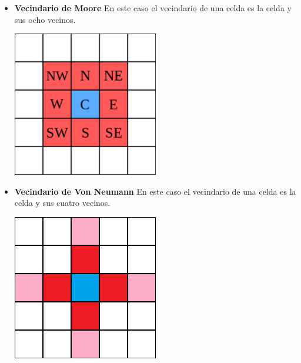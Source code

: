     \begin{itemize}
        \item 
            \begin{minipage}
                {0.5\textwidth}
                \textbf{Vecindario de Moore} En este caso el vecindario de una celda es la celda y sus ocho vecinos.
            \end{minipage}
            \begin{minipage}
                {0.5\textwidth}
                \centering
                \includegraphics[width=0.5\textwidth]{./images/marco_teorico/automatas_celulares/mooreN.png}
                \label{fig:vecindario}
            \end{minipage}
        \item
            \begin{minipage}
                {0.5\textwidth}
                \textbf{Vecindario de Von Neumann} En este caso el vecindario de una celda es la celda y sus cuatro vecinos.
            \end{minipage}
            \begin{minipage}
                {0.5\textwidth}
                \centering
                \includegraphics[width=0.5\textwidth]{./images/marco_teorico/automatas_celulares/vonN.png}

\end{minipage}
\end{itemize}
